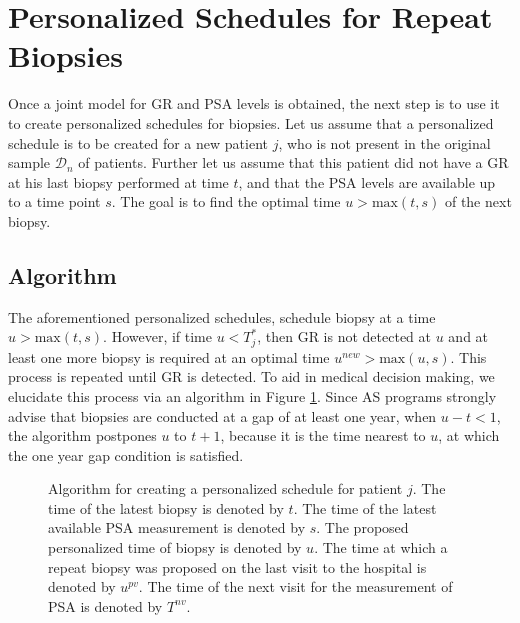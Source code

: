 \section{Personalized Schedules for Repeat Biopsies}
\label{sec : pers_sched_approaches}
Once a joint model for GR and PSA levels is obtained, the next step is to use it to create personalized schedules for biopsies. Let us assume that a personalized schedule is to be created for a new patient $j$, who is not present in the original sample $\mathcal{D}_n$ of patients. Further let us assume that this patient did not have a GR at his last biopsy performed at time $t$, and that the PSA levels are available up to a time point $s$. The goal is to find the optimal time $u > \mbox{max}(t,s)$ of the next biopsy. 





\subsection{Algorithm}
\label{subsec : pers_sched_algorithm}
The aforementioned personalized schedules, schedule biopsy at a time $u > \mbox{max}(t,s)$. However, if time $u < T^*_j$, then GR is not detected at $u$ and at least one more biopsy is required at an optimal time $u^{new} > \mbox{max}(u,s)$. This process is repeated until GR is detected. To aid in medical decision making, we elucidate this process via an algorithm in Figure \ref{fig : sched_algorithm}. Since AS programs strongly advise that biopsies are conducted at a gap of at least one year, when $u - t < 1$, the algorithm postpones $u$ to $t + 1$, because it is the time nearest to $u$, at which the one year gap condition is satisfied.


\begin{figure}
\centerline{}
\caption{Algorithm for creating a personalized schedule for patient $j$. The time of the latest biopsy is denoted by $t$. The time of the latest available PSA measurement is denoted by $s$. The proposed personalized time of biopsy is denoted by $u$.  The time at which a repeat biopsy was proposed on the last visit to the hospital is denoted by $u^{pv}$. The time of the next visit for the measurement of PSA is denoted by $T^{nv}$.} 
\label{fig : sched_algorithm}
\end{figure}

